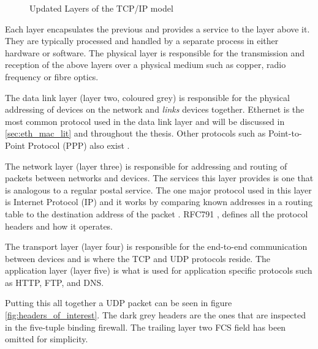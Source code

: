 \begin{figure}[H]
    \centering
    \caption{Updated Layers of the TCP/IP model}
    \label{fig:tcp_ip_model}
\end{figure}

\noindent Each layer encapsulates the previous and provides a service to the layer above it. They are typically processed and handled by a separate process in either hardware or software. The physical layer is responsible for the transmission and reception of the above layers over a physical medium such as copper, radio frequency or fibre optics. 

The data link layer (layer two, coloured grey) is responsible for the physical addressing of devices on the network and \textit{links} devices together. Ethernet is the most common protocol used in the data link layer and will be discussed in \ref{sec:eth_mac_lit} and throughout the thesis. Other protocols such as Point-to-Point Protocol (PPP) also exist \cite{ciscoCCNABook}.

The network layer (layer three) is responsible for addressing and routing of packets between networks and devices. The services this layer provides is one that is analogous to a regular postal service. The one major protocol used in this layer is Internet Protocol (IP) and it works by comparing known addresses in a routing table to the destination address of the packet \cite{ciscoCCNABook}. RFC791 \cite{rfc791}, defines all the protocol headers and how it operates.

The transport layer (layer four) is responsible for the end-to-end communication between devices and is where the TCP and UDP protocols reside. The application layer (layer five) is what is used for application specific protocols such as HTTP, FTP, and DNS.

Putting this all together a UDP packet can be seen in figure \ref{fig:headers_of_interest}. The dark grey headers are the ones that are inspected in the five-tuple binding firewall. The trailing layer two FCS field has been omitted for simplicity. 

